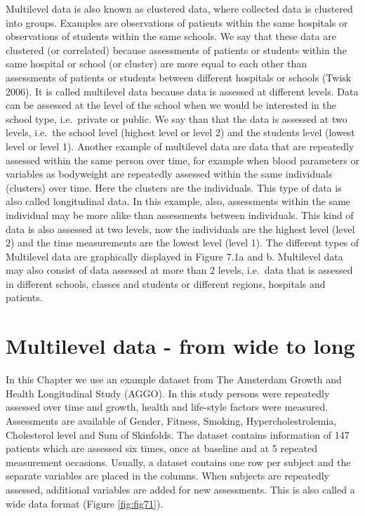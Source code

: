 \documentclass[]{book}
\begin{document}
Multilevel data is also known as clustered data, where collected data is
clustered into groups. Examples are observations of patients within the
same hospitals or observations of students within the same schools. We
say that these data are clustered (or correlated) because assessments of
patients or students within the same hospital or school (or cluster) are
more equal to each other than assessments of patients or students
between different hospitals or schools (Twisk 2006). It is called
multilevel data because data is assessed at different levels. Data can
be assessed at the level of the school when we would be interested in
the school type, i.e.~private or public. We say than that the data is
assessed at two levels, i.e.~the school level (highest level or level 2)
and the students level (lowest level or level 1). Another example of
multilevel data are data that are repeatedly assessed within the same
person over time, for example when blood parameters or variables as
bodyweight are repeatedly assessed within the same individuals
(clusters) over time. Here the clusters are the individuals. This type
of data is also called longitudinal data. In this example, also,
assessments within the same individual may be more alike than
assessments between individuals. This kind of data is also assessed at
two levels, now the individuals are the highest level (level 2) and the
time measurements are the lowest level (level 1). The different types of
Multilevel data are graphically displayed in Figure 7.1a and b.
Multilevel data may also consist of data assessed at more than 2 levels,
i.e.~data that is assessed in different schools, classes and students or
different regions, hospitals and patients.

\section{Multilevel data - from wide to
long}\label{multilevel-data---from-wide-to-long}

In this Chapter we use an example dataset from The Amsterdam Growth and
Health Longitudinal Study (AGGO). In this study persons were repeatedly
assessed over time and growth, health and life-style factors were
measured. Assessments are available of Gender, Fitness, Smoking,
Hypercholestrolemia, Cholesterol level and Sum of Skinfolds. The dataset
contains information of 147 patients which are assessed six times, once
at baseline and at 5 repeated measurement occasions. Usually, a dataset
contains one row per subject and the separate variables are placed in
the columns. When subjects are repeatedly assessed, additional variables
are added for new assessments. This is also called a wide data format
(Figure \ref{fig:fig71}).
\end{document}
